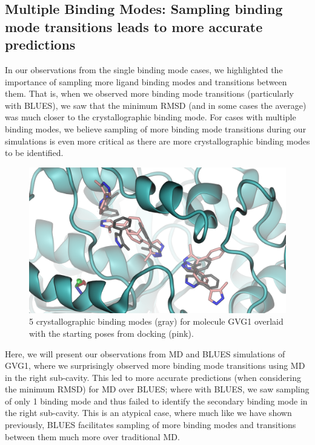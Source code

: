 \subsection{Multiple Binding Modes: Sampling binding mode transitions leads to more accurate predictions}
In our observations from the single binding mode cases, we highlighted the importance of sampling more ligand binding modes and transitions between them.
That is, when we observed more binding mode transitions (particularly with BLUES), we saw that the minimum RMSD (and in some cases the average) was much closer to the crystallographic binding mode.
For cases with multiple binding modes, we believe sampling of more binding mode transitions during our simulations is even more critical as there are more crystallographic binding modes to be identified.

\begin{figure}
    \centering
    \includegraphics{chapter6/Figures/GVG_1-poses.png}
    \caption[GVG1 docked poses]{5 crystallographic binding modes (gray) for molecule GVG1 overlaid with the starting poses from docking (pink).}
    \label{fig:GVG1-poses}
\end{figure}

Here, we will present our observations from MD and BLUES simulations of GVG1, where we surprisingly observed more binding mode transitions using MD in the right sub-cavity.
This led to more accurate predictions (when considering the minimum RMSD) for MD over BLUES; where with BLUES, we saw sampling of only 1 binding mode and thus failed to identify the secondary binding mode in the right sub-cavity.
This is an atypical case, where much like we have shown previously, BLUES facilitates sampling of more binding modes and transitions between them much more over traditional MD.

